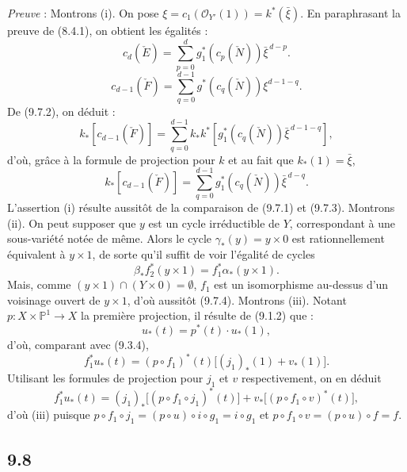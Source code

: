 \emph{Preuve} : Montrons (i). On pose $\xi=c_1(\mathcal{O}_{Y'}(1))=k^*(\bar\xi)$. En paraphrasant la preuve de (8.4.1), on
obtient les égalités :
\[
c_d(\check E)=\sum_{p=0}^d g_1^*(c_p(\check N))\bar\xi^{\,d-p}.
\tag{9.7.1}
\]
\[
c_{d-1}(\check F)=\sum_{q=0}^{d-1}g^*(c_q(\check N))\xi^{d-1-q}.
\tag{9.7.2}
\]
De (9.7.2), on déduit :
\[
k_*[c_{d-1}(\check F)]
=\sum_{q=0}^{d-1}k_*k^*[g_1^*(c_q(\check N))\bar\xi^{\,d-1-q}],
\]
d'où, grâce à la formule de projection pour $k$ et au fait que $k_*(1)=\bar\xi$,
\[
k_*[c_{d-1}(\check F)]=\sum_{q=0}^{d-1}g_1^*(c_q(\check N))\bar\xi^{\,d-q}.
\tag{9.7.3}
\]
L'assertion (i) résulte aussitôt de la comparaison de (9.7.1) et (9.7.3). Montrons (ii). On peut supposer que $y$ est un cycle irréductible de $Y$, correspondant à une sous-variété notée de même. Alors le cycle $\gamma_*(y)=y\times0$ est rationnellement équivalent à $y\times1$, de sorte qu'il suffit de voir l'égalité de cycles
\[
\beta_*f_2^*(y\times1)=f_1^*\alpha_*(y\times1).
\tag{9.7.4}
\]
Mais, comme $(y\times1)\cap(Y\times0)=\emptyset$, $f_1$ est un isomorphisme au-dessus d'un voisinage ouvert de $y\times1$, d'où aussitôt (9.7.4). Montrons (iii). Notant $p:X\times\mathbb{P}^1\to X$ la première projection, il résulte de (9.1.2) que :
\[
u_*(t)=p^*(t)\cdot u_*(1),
\tag{9.7.5}
\]
d'où, comparant avec (9.3.4),
\[
f_1^*u_*(t)=(p\circ f_1)^*(t)\bigl[(j_1)_*(1)+v_*(1)\bigr].
\tag{9.7.6}
\]
Utilisant les formules de projection pour $j_1$ et $v$ respectivement, on en déduit
\[
f_1^*u_*(t)=(j_1)_*\bigl[(p\circ f_1\circ j_1)^*(t)\bigr]+v_*\bigl[(p\circ f_1\circ v)^*(t)\bigr],
\tag{9.7.7}
\]
d'où (iii) puisque $p\circ f_1\circ j_1=(p\circ u)\circ i\circ g_1=i\circ g_1$ et $p\circ f_1\circ v=(p\circ u)\circ f=f$.

\subsection*{9.8}

